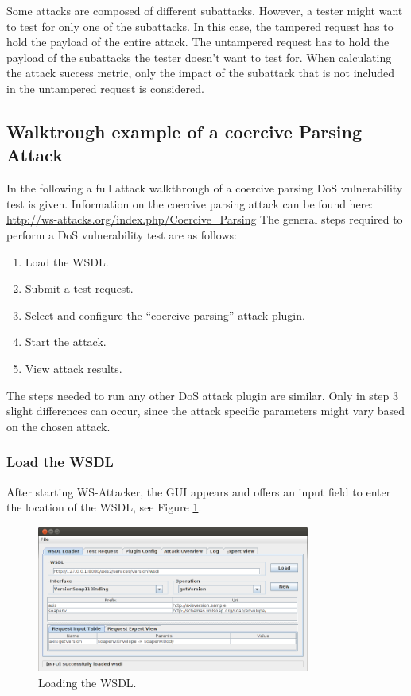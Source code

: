 Some attacks are composed of different subattacks. However, a tester might want to test for only one of the subattacks. 
In this case, the tampered request has to hold the payload of the entire attack. The untampered request has to hold the payload of the subattacks the tester doesn’t want to test for. 
When calculating the attack success metric, only the impact of the subattack that is not included in the untampered request is considered.



\subsection{Walktrough example of a coercive Parsing Attack}
\label{sec:walkthrough_example}

In the following a full attack walkthrough of a coercive parsing DoS vulnerability test is given. Information on the coercive parsing attack can be found here: \url{http://ws-attacks.org/index.php/Coercive_Parsing}
The general steps required to perform a DoS vulnerability test are as follows: 
\begin{enumerate}
    \item Load the WSDL.
    \item Submit a test request.
    \item Select and configure the ``coercive parsing'' attack plugin.
    \item Start the attack.
    \item View attack results.
\end{enumerate}

The steps needed to run any other DoS attack plugin are similar. 
Only in step 3 slight differences can occur, since the attack specific parameters might vary based on the chosen attack.


\subsubsection{Load the WSDL}
\label{sec:loading_a_wsdl_dos}

After starting WS-Attacker, the GUI appears and offers an input field to enter the location
of the WSDL, see Figure \ref{fig:dosStep1}.

\begin{figure}[h!]
    \begin{center}
        \includegraphics[width=0.8\textwidth]{img/dosStep1}
    \end{center}
    \caption{Loading the WSDL.}
    \label{fig:dosStep1}
\end{figure}

